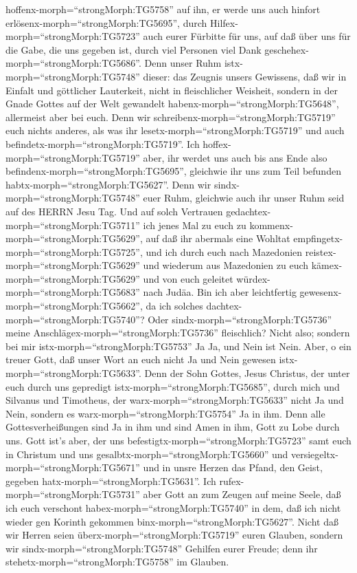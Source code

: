 hoffenx-morph=``strongMorph:TG5758'' auf ihn, er werde uns auch hinfort
erlösenx-morph=``strongMorph:TG5695'',  durch
Hilfex-morph=``strongMorph:TG5723'' auch eurer Fürbitte für uns, auf daß
über uns für die Gabe, die uns gegeben ist, durch viel Personen viel
Dank geschehex-morph=``strongMorph:TG5686''.  Denn unser
Ruhm istx-morph=``strongMorph:TG5748'' dieser: das Zeugnis unsers
Gewissens, daß wir in Einfalt und göttlicher Lauterkeit, nicht in
fleischlicher Weisheit, sondern in der Gnade Gottes auf der Welt
gewandelt habenx-morph=``strongMorph:TG5648'', allermeist aber bei euch.
 Denn wir schreibenx-morph=``strongMorph:TG5719'' euch
nichts anderes, als was ihr lesetx-morph=``strongMorph:TG5719'' und auch
befindetx-morph=``strongMorph:TG5719''. Ich
hoffex-morph=``strongMorph:TG5719'' aber, ihr werdet uns auch bis ans
Ende also befindenx-morph=``strongMorph:TG5695'', gleichwie ihr uns zum
Teil befunden habtx-morph=``strongMorph:TG5627''.  Denn wir
sindx-morph=``strongMorph:TG5748'' euer Ruhm, gleichwie auch ihr unser
Ruhm seid auf des HERRN Jesu Tag.  Und auf solch Vertrauen
gedachtex-morph=``strongMorph:TG5711'' ich jenes Mal zu euch zu
kommenx-morph=``strongMorph:TG5629'', auf daß ihr abermals eine Wohltat
empfingetx-morph=``strongMorph:TG5725'',  und ich durch
euch nach Mazedonien reistex-morph=``strongMorph:TG5629'' und wiederum
aus Mazedonien zu euch kämex-morph=``strongMorph:TG5629'' und von euch
geleitet würdex-morph=``strongMorph:TG5683'' nach Judäa. 
Bin ich aber leichtfertig gewesenx-morph=``strongMorph:TG5662'', da ich
solches dachtex-morph=``strongMorph:TG5740''? Oder
sindx-morph=``strongMorph:TG5736'' meine
Anschlägex-morph=``strongMorph:TG5736'' fleischlich? Nicht also; sondern
bei mir istx-morph=``strongMorph:TG5753'' Ja Ja, und Nein ist Nein.
 Aber, o ein treuer Gott, daß unser Wort an euch nicht Ja
und Nein gewesen istx-morph=``strongMorph:TG5633''.  Denn
der Sohn Gottes, Jesus Christus, der unter euch durch uns gepredigt
istx-morph=``strongMorph:TG5685'', durch mich und Silvanus und
Timotheus, der warx-morph=``strongMorph:TG5633'' nicht Ja und Nein,
sondern es warx-morph=``strongMorph:TG5754'' Ja in ihm. 
Denn alle Gottesverheißungen sind Ja in ihm und sind Amen in ihm, Gott
zu Lobe durch uns.  Gott ist's aber, der uns
befestigtx-morph=``strongMorph:TG5723'' samt euch in Christum und uns
gesalbtx-morph=``strongMorph:TG5660''  und
versiegeltx-morph=``strongMorph:TG5671'' und in unsre Herzen das Pfand,
den Geist, gegeben hatx-morph=``strongMorph:TG5631''.  Ich
rufex-morph=``strongMorph:TG5731'' aber Gott an zum Zeugen auf meine
Seele, daß ich euch verschont habex-morph=``strongMorph:TG5740'' in dem,
daß ich nicht wieder gen Korinth gekommen
binx-morph=``strongMorph:TG5627''.  Nicht daß wir Herren
seien überx-morph=``strongMorph:TG5719'' euren Glauben, sondern wir
sindx-morph=``strongMorph:TG5748'' Gehilfen eurer Freude; denn ihr
stehetx-morph=``strongMorph:TG5758'' im Glauben.

